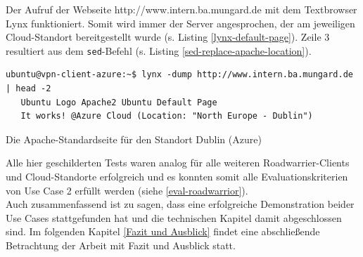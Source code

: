 Der Aufruf der Webseite \glqq http://www.intern.ba.mungard.de\grqq{} mit dem Textbrowser Lynx funktioniert. Somit wird immer der Server angesprochen, der am jeweiligen Cloud-Standort bereitgestellt wurde (s. Listing \ref{lynx-default-page}). Zeile 3 resultiert aus dem \texttt{sed}-Befehl (s. Listing \ref{sed-replace-apache-location}).
\begin{listing}[h]
\begin{verbatim}
ubuntu@vpn-client-azure:~$ lynx -dump http://www.intern.ba.mungard.de | head -2
   Ubuntu Logo Apache2 Ubuntu Default Page
   It works! @Azure Cloud (Location: "North Europe - Dublin")

\end{verbatim}
\caption{Die Apache-Standardseite für den Standort Dublin (Azure)}
\label{lynx-default-page}
\end{listing}\FloatBarrier
Alle hier geschilderten Tests waren analog für alle weiteren Roadwarrier-\gls{Client}s und Cloud-Standorte erfolgreich und es konnten somit alle Evaluationskriterien von Use Case 2 erfüllt werden (siehe \ref{eval-roadwarrior}).\\
Auch zusammenfassend ist zu sagen, dass eine erfolgreiche Demonstration beider Use Cases stattgefunden hat und die technischen Kapitel damit abgeschlossen sind. Im folgenden Kapitel \ref{Fazit und Ausblick} findet eine abschließende Betrachtung der Arbeit mit Fazit und Ausblick statt.
